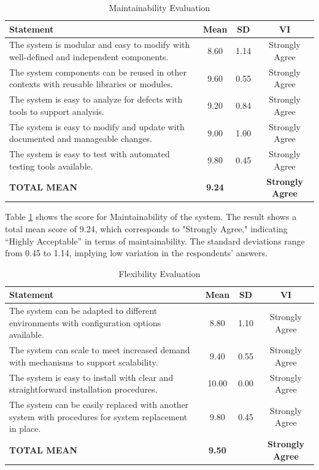 	\begin{table}[h!]
		\centering
		\caption{Maintainability Evaluation}
		\label{mntnblty}
		\renewcommand{\arraystretch}{1.2}
		\begin{tabularx}{\linewidth}{|X|c|c|c|}
			\hline
			\textbf{Statement} & \textbf{Mean} & \textbf{SD} & \textbf{VI} \\ \hline
			The system is modular and easy to modify with well-defined and independent components.
			& 8.60 & 1.14 & Strongly Agree \\ \hline
			The system components can be reused in other contexts with reusable libraries or modules.
			& 9.60 & 0.55 & Strongly Agree \\ \hline
			The system is easy to analyze for defects with tools to support analysis.
			& 9.20 & 0.84 & Strongly Agree \\ \hline
			The system is easy to modify and update with documented and manageable changes.
			& 9.00 & 1.00 & Strongly Agree \\ \hline
			The system is easy to test with automated testing tools available.
			& 9.80 & 0.45 & Strongly Agree \\ \hline
			\textbf{TOTAL MEAN} & \textbf{9.24} & & \textbf{Strongly Agree} \\ \hline
		\end{tabularx}
	\end{table}
	
	Table \ref{mntnblty} shows the score for Maintainability of the system. The result shows a total mean score of 9.24, which corresponds to "Strongly Agree," indicating “Highly Acceptable” in terms of maintainability. The standard deviations range from 0.45 to 1.14, implying low variation in the respondents’ answers.
	
	\begin{table}[h!]
		\centering
		\caption{Flexibility Evaluation}
		\label{flxblty}
		\renewcommand{\arraystretch}{1.2}
		\begin{tabularx}{\linewidth}{|X|c|c|c|}
			\hline
			\textbf{Statement} & \textbf{Mean} & \textbf{SD} & \textbf{VI} \\ \hline
			The system can be adapted to different environments with configuration options available.
			& 8.80 & 1.10 & Strongly Agree \\ \hline
			The system can scale to meet increased demand with mechanisms to support scalability.
			& 9.40 & 0.55 & Strongly Agree \\ \hline
			The system is easy to install with clear and straightforward installation procedures.
			& 10.00 & 0.00 & Strongly Agree \\ \hline
			The system can be easily replaced with another system with procedures for system replacement in place.
			& 9.80 & 0.45 & Strongly Agree \\ \hline
			\textbf{TOTAL MEAN} & \textbf{9.50} & & \textbf{Strongly Agree} \\ \hline
		\end{tabularx}
	\end{table}
	
